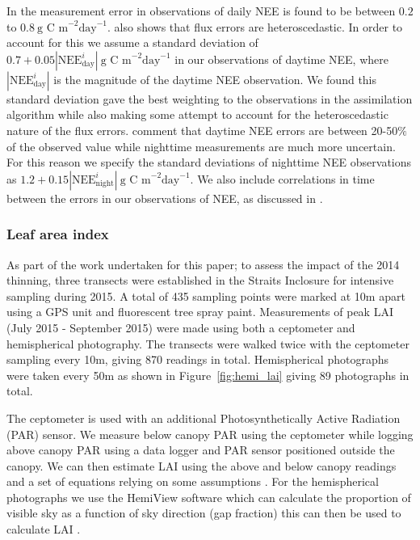 \documentclass[11pt]{article}
\begin{document}
In \citet{Richardson200838} the measurement error in observations of daily NEE is found to be between $0.2$ to $0.8~\text{g C m}^{-2} \text{day}^{-1}$.  \citet{Richardson200838} also shows that flux errors are heteroscedastic. In order to account for this we assume a standard deviation of $0.7 + 0.05|\text{NEE}_{\text{day}}^{i}|~\text{g C m}^{-2} \text{day}^{-1}$ in our observations of daytime NEE, where \(|\text{NEE}_{\text{day}}^{i}|\) is the magnitude of the daytime NEE observation. We found this standard deviation gave the best weighting to the observations in the assimilation algorithm while also making some attempt to account for the heteroscedastic nature of the flux errors. \citet{raupach2005model} comment that daytime NEE errors are between 20-50\(\%\) of the observed value while nighttime measurements are much more uncertain. For this reason we specify the standard deviations of nighttime NEE observations as $1.2 + 0.15|\text{NEE}_{\text{night}}^{i}|~\text{g C m}^{-2} \text{day}^{-1}$. We also include correlations in time between the errors in our observations of NEE, as discussed in \citet{Pinnington2016299}.

\subsubsection{Leaf area index}

As part of the work undertaken for this paper; to assess the impact of the 2014 thinning, three transects were established in the Straits Inclosure for intensive sampling during 2015. A total of 435 sampling points were marked at 10m apart using a GPS unit and fluorescent tree spray paint. Measurements of peak LAI (July 2015 - September 2015) were made using both a ceptometer and hemispherical photography. The transects were walked twice with the ceptometer sampling every 10m, giving 870 readings in total. Hemispherical photographs were taken every 50m as shown in Figure~\ref{fig:hemi_lai} giving 89 photographs in total. 

The ceptometer is used with an additional Photosynthetically Active Radiation (PAR) sensor. We measure below canopy PAR using the ceptometer while logging above canopy PAR using a data logger and PAR sensor positioned outside the canopy. We can then estimate LAI using the above and below canopy readings and a set of equations relying on some assumptions \citep{fassnacht1994comparison}.
For the hemispherical photographs we use the HemiView software \citep{rich1999hemiview} which can calculate the proportion of visible sky as a function of sky direction (gap fraction) this can then be used to calculate LAI  \citep{Jonckheere2004}.
\end{document}
